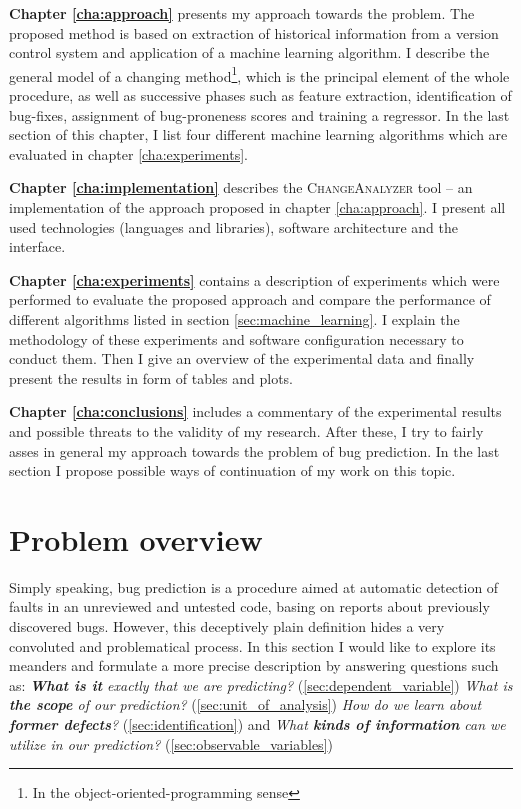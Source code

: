 \documentclass{pracamgr}
\begin{document}
\medskip \noindent
\textbf{Chapter \ref{cha:approach}} presents my approach towards the problem. The proposed method is based on extraction of historical information from a version control system and application of a machine learning algorithm. I describe the general model of a changing method\footnote{In the object-oriented-programming sense}, which is the principal element of the whole procedure, as well as successive phases such as feature extraction, identification of bug-fixes, assignment of bug-proneness scores and training a regressor. In the last section of this chapter, I list four different machine learning algorithms which are evaluated in chapter \ref{cha:experiments}.

\medskip \noindent
\textbf{Chapter \ref{cha:implementation}} describes the \textsc{ChangeAnalyzer} tool -- an implementation of the approach proposed in chapter \ref{cha:approach}. I present all used technologies (languages and libraries), software architecture and the interface.

\medskip \noindent
\textbf{Chapter \ref{cha:experiments}} contains a description of experiments which were performed to evaluate the proposed approach and compare the performance of different algorithms listed in section \ref{sec:machine_learning}. I explain the methodology of these experiments and software configuration necessary to conduct them. Then I give an overview of the experimental data and finally present the results in form of tables and plots.

\medskip \noindent
\textbf{Chapter \ref{cha:conclusions}} includes a commentary of the experimental results and possible threats to the validity of my research. After these, I try to fairly asses in general my approach towards the problem of bug prediction. In the last section I propose possible ways of continuation of my work on this topic.

\chapter{Problem overview}
\label{cha:overview}
Simply speaking, bug prediction is a procedure aimed at automatic detection of faults in an unreviewed and untested code, basing on reports about previously discovered bugs. However, this deceptively plain definition hides a very convoluted and problematical process. In this section I would like to explore its meanders and formulate a more precise description by answering questions such as: \emph{\textbf{What is it} exactly that we are predicting?} (\ref{sec:dependent_variable}) \emph{What is \textbf{the scope} of our prediction?} (\ref{sec:unit_of_analysis}) \emph{How do we learn about \textbf{former defects}?} (\ref{sec:identification}) and \emph{What \textbf{kinds of information} can we utilize in our prediction?} (\ref{sec:observable_variables})
\end{document}
